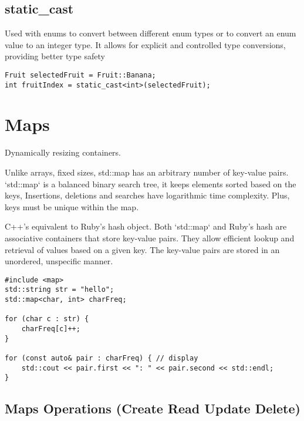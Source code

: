 \subsection{static\_cast}

Used with enums to convert between different enum types or to convert an enum value to an integer type.
It allows for explicit and controlled type conversions, providing better type safety

\begin{verbatim}
Fruit selectedFruit = Fruit::Banana;
int fruitIndex = static_cast<int>(selectedFruit);
\end{verbatim}

\section{Maps}

Dynamically resizing containers.

Unlike arrays, fixed sizes, std::map has an arbitrary number of key-value pairs.
`std::map` is a balanced binary search tree, it keeps elements sorted based on the keys, 
Insertions, deletions and searches have logarithmic time complexity.
Plus, keys must be unique within the map.

C++'s equivalent to Ruby's hash object. 
Both `std::map` and Ruby's hash are associative containers that store key-value pairs.
They allow efficient lookup and retrieval of values based on a given key.
The key-value pairs are stored in an unordered, unspecific manner.

\begin{verbatim}
#include <map>
std::string str = "hello";
std::map<char, int> charFreq;

for (char c : str) {
    charFreq[c]++;
}

for (const auto& pair : charFreq) { // display
    std::cout << pair.first << ": " << pair.second << std::endl;
}
\end{verbatim}

 
\subsection{Maps Operations (Create Read Update Delete)}

